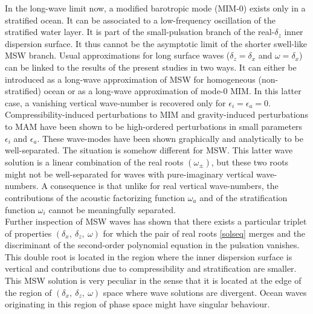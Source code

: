 \documentclass[a4paper,11pt]{article}
\begin{document}
In the long-wave limit now, a modified barotropic mode (MIM-0) exists only in a stratified ocean. It can be associated to a low-frequency oscillation of the stratified water layer. It is part of the small-pulsation branch of the real-$\delta_z$ inner dispersion surface. It thus cannot be the asymptotic limit of the shorter swell-like MSW branch. Usual approximations for long surface waves ($\delta_z=\delta_x$ and $\omega=\delta_x$) can be linked to the results of the present studies in two ways. It can either be introduced as a long-wave approximation of MSW for homogeneous (non-stratified) ocean or as a long-wave approximation of mode-0 MIM. In this latter case, a vanishing vertical wave-number is recovered only for $\epsilon_i=\epsilon_a=0$.\\

Compressibility-induced perturbations to MIM and gravity-induced perturbations to MAM have been shown to be high-ordered perturbations in small parameters $\epsilon_i$ and $\epsilon_a$. These wave-modes have been shown  graphically and analytically to be well-separated. The situation is somehow different for MSW. This latter wave solution is a linear combination of the real roots $(\omega_\pm)$, but these two roots might not be well-separated for waves with pure-imaginary vertical wave-numbers. A consequence is that unlike for real vertical wave-numbers, the contributions of the acoustic factorizing function $\omega_a$ and of the stratification function $\omega_i$ cannot be meaningfully separated.\\

Further inspection of MSW waves has shown that there exists a particular triplet of properties $(\delta_x,\ \delta_z,\ \omega)$ for which the pair of real roots \ref{solseq} merges and the discriminant of the second-order polynomial equation in the pulsation vanishes. This double root is located in the region where the inner dispersion surface is vertical and contributions due to compressibility and stratification are smaller. This MSW solution is very peculiar in the sense that it is located at the edge of the region of $(\delta_x,\ \delta_z,\ \omega)$ space where wave solutions are divergent. Ocean waves originating in this region of phase space might have singular behaviour.\\


\newpage




\end{document}
